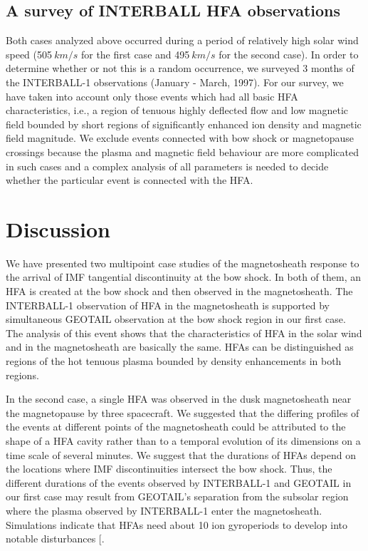 \documentclass{article}
\begin{document}
\begin{article}
\subsection{A survey of INTERBALL HFA observations}
Both cases analyzed above occurred during a period of relatively
high solar wind speed (505$\>km/s$ for the first case and
495$\>km/s$ for the
second case). In order to determine whether or not this is a random
occurrence, we surveyed  3 months of the INTERBALL-1
observations (January - March, 1997).
For our survey, we have taken into account only those events
which had all basic HFA characteristics, i.e., a region of tenuous
highly deflected flow and low magnetic field bounded by short
regions of significantly enhanced ion density and magnetic field
magnitude. We exclude events connected with bow shock or
magnetopause crossings because the plasma and magnetic field
behaviour are more complicated in such cases and a complex
analysis of all parameters is needed to decide whether the particular
event is connected with the HFA.

\section{Discussion}
We have presented two multipoint case studies of the
magnetosheath response to the arrival of  IMF tangential
discontinuity at the bow shock.
In both of them, an HFA is created at the bow shock and then
observed in the magnetosheath. The INTERBALL-1 observation of HFA
in the magnetosheath is supported by simultaneous GEOTAIL
observation at the bow shock region in our first case. The analysis
of this event shows that the characteristics of HFA in the
solar wind and in the magnetosheath are basically the same. HFAs
can be distinguished as regions of the hot tenuous plasma bounded
by density enhancements in both regions.

In the second case, a single HFA was observed in the dusk magnetosheath
near the magnetopause by three spacecraft.
We suggested that the differing profiles of the
events at different points of the magnetosheath could be attributed
to the shape of a HFA cavity rather than to a temporal evolution of
its dimensions on a time scale of several minutes.
We suggest that the durations of HFAs depend on the locations
where IMF discontinuities intersect the bow shock.
Thus, the different durations of the events observed by
INTERBALL-1 and GEOTAIL  in our first case  may result from
GEOTAIL's separation from the subsolar region where the plasma
observed by INTERBALL-1 enter the magnetosheath.
Simulations indicate that HFAs need about 10
ion gyroperiods to develop into notable disturbances [\markcite{{\it
Thomas et al.}, 1991]}.


\end{article}
\end{document}
